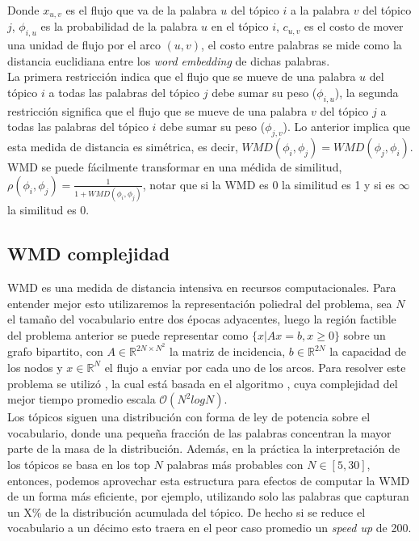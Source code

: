 \documentclass[letterpaper,12pt,oneside]{book} %
\begin{document}
Donde $x_{u,v}$ es el flujo que va de la palabra $u$ del tópico $i$ a la palabra $v$ del tópico $j$, $\phi_{i,u}$ es la probabilidad de la palabra $u$ en el tópico $i$, $c_{u,v}$ es el costo de mover una unidad de flujo por el arco $(u,v)$, el costo entre palabras se mide como la distancia euclidiana entre los \textit{word embedding} de dichas palabras.\\

La primera restricción indica que el flujo que se mueve de una palabra $u$ del tópico $i$ a todas las palabras del tópico $j$ debe sumar su peso ($\phi_{i,u}$), la segunda restricción significa que el flujo que se mueve de una palabra $v$ del tópico $j$ a todas las palabras del tópico $i$ debe sumar su peso ($\phi_{j,v}$). Lo anterior implica que esta medida de distancia es simétrica, es decir, $WMD(\phi_{i}, \phi_{j}) = WMD(\phi_{j}, \phi_{i})$.\\

WMD se puede fácilmente transformar en una médida de similitud, $\rho(\phi_{i}, \phi_{j}) = \frac{1}{1+WMD(\phi_{i}, \phi_{j})}$, notar que si la WMD es 0 la similitud es 1 y si es $\infty$ la similitud es 0. \\

\subsection{WMD complejidad}

WMD es una medida de distancia intensiva en recursos computacionales. Para entender mejor esto utilizaremos la representación poliedral del problema, sea $N$ el tamaño del vocabulario entre dos épocas adyacentes, luego la región factible del problema anterior se puede representar como $\{x| Ax=b, x\geq 0\}$ sobre un grafo bipartito, con $A\in \mathbb{R}^{2N\times N^{2}}$ la matriz de incidencia, $b\in \mathbb{R}^{2N}$ la capacidad de los nodos y $x\in \mathbb{R}^{N}$ el flujo a enviar por cada uno de los arcos. Para resolver este problema se utilizó \citep{PyEMD}, la cual está basada en el algoritmo \citep{pele2009fast}, cuya complejidad del mejor tiempo promedio escala $\mathcal{O}(N^{2}log N)$.\\

Los tópicos siguen una distribución con forma de ley de potencia sobre el vocabulario, donde una pequeña fracción de las palabras concentran la mayor parte de la masa de la distribución. Además, en la práctica la interpretación de los tópicos se basa en los top $N$ palabras más probables con $N \in [5, 30]$, entonces, podemos aprovechar esta estructura para efectos de computar la WMD de un forma más eficiente, por ejemplo, utilizando solo las palabras que capturan un X\% de la distribución acumulada del tópico. De hecho si se reduce el vocabulario a un décimo esto traera en el peor caso promedio un \textit{speed up} de 200.\\
\end{document}
